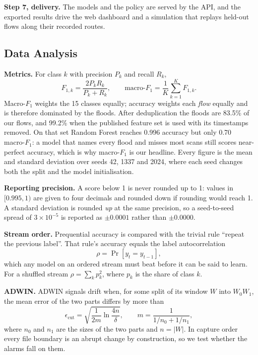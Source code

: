 \documentclass[conference]{IEEEtran}
\begin{document}
\textbf{Step 7, delivery.} The models and the policy are served by the API, and the exported results drive the web dashboard and a simulation that replays held-out flows along their recorded routes.

\subsection{Data Analysis}

\textbf{Metrics.} For class $k$ with precision $P_k$ and recall $R_k$,
\begin{equation}
F_{1,k} = \frac{2 P_k R_k}{P_k + R_k}, \qquad
\text{macro-}F_1 = \frac{1}{K} \sum_{k=1}^{K} F_{1,k}.
\label{eq:f1}
\end{equation}
Macro-$F_1$ weights the 15 classes equally; accuracy weights each \emph{flow} equally and is therefore dominated by the floods. After deduplication the floods are 83.5\% of our flows, and 99.2\% when the published feature set is used with its timestamps removed. On that set Random Forest reaches 0.996 accuracy but only 0.70 macro-$F_1$: a model that names every flood and misses most scans still scores near-perfect accuracy, which is why macro-$F_1$ is our headline. Every figure is the mean and standard deviation over seeds 42, 1337 and 2024, where each seed changes both the split and the model initialisation.

\textbf{Reporting precision.} A score below 1 is never rounded up to 1: values in $[0.995, 1)$ are given to four decimals and rounded down if rounding would reach 1. A standard deviation is rounded \emph{up} at the same precision, so a seed-to-seed spread of $3\times10^{-5}$ is reported as $\pm0.0001$ rather than $\pm0.0000$.

\textbf{Stream order.} Prequential accuracy is compared with the trivial rule ``repeat the previous label''. That rule's accuracy equals the label autocorrelation
\begin{equation}
\rho = \Pr\left[y_t = y_{t-1}\right],
\label{eq:rho}
\end{equation}
which any model on an ordered stream must beat before it can be said to learn. For a shuffled stream $\rho = \sum_k p_k^2$, where $p_k$ is the share of class $k$.

\textbf{ADWIN.} ADWIN signals drift when, for some split of its window $W$ into $W_0 W_1$, the mean error of the two parts differs by more than
\begin{equation}
\epsilon_{\text{cut}} = \sqrt{\frac{1}{2m}\ln\frac{4n}{\delta}}, \qquad m = \frac{1}{1/n_0 + 1/n_1},
\label{eq:adwin}
\end{equation}
where $n_0$ and $n_1$ are the sizes of the two parts and $n = |W|$. In capture order every file boundary is an abrupt change by construction, so we test whether the alarms fall on them.
\end{document}
